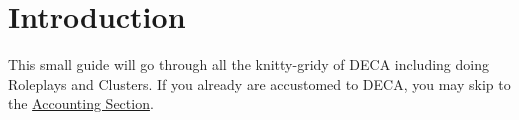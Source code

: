 \chapter{Introduction}

This small guide will go through all the
knitty-gridy of DECA including doing Roleplays
and Clusters. If you already are accustomed
to DECA, you may skip to the \hyperref[sec:Accounting]{Accounting Section}.